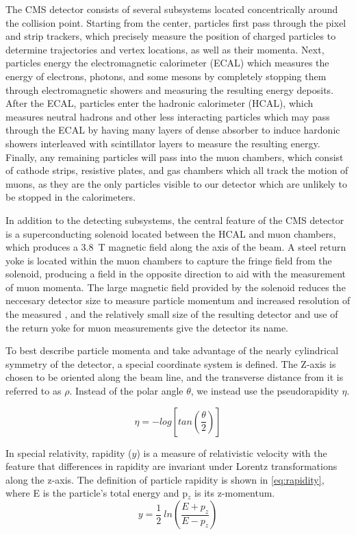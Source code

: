 The CMS detector consists of several subsystems located concentrically around the collision point. 
Starting from the center, particles first pass through the pixel and strip trackers, which precisely measure the position of charged particles to determine trajectories and vertex locations, as well as their momenta.
Next, particles energy the electromagnetic calorimeter (ECAL) which measures the energy of electrons, photons, and some mesons by completely stopping them through electromagnetic showers and measuring the resulting energy deposits.
After the ECAL, particles enter the hadronic calorimeter (HCAL), which measures neutral hadrons and other less interacting particles which may pass through the ECAL by having many layers of dense absorber to induce hardonic showers interleaved with scintillator layers to measure the resulting energy.
Finally, any remaining particles will pass into the muon chambers, which consist of cathode strips, resistive plates, and gas chambers which all track the motion of muons, as they are the only particles visible to our detector which are unlikely to be stopped in the calorimeters.

In addition to the detecting subsystems, the central feature of the CMS detector is a superconducting solenoid located between the HCAL and muon chambers, which produces a \SI{3.8}{\tesla} magnetic field along the axis of the beam. 
A steel return yoke is located within the muon chambers to capture the fringe field from the solenoid, producing a field in the opposite direction to aid with the measurement of muon momenta.
The large magnetic field provided by the solenoid reduces the neccesary detector size to measure particle momentum and increased resolution of the measured \pt, and the relatively small size of the resulting detector and use of the return yoke for muon measurements give the detector its name.

To best describe particle momenta and take advantage of the nearly cylindrical symmetry of the detector, a special coordinate system is defined. 
The Z-axis is chosen to be oriented along the beam line, and the transverse distance from it is referred to as $\rho$. 
Instead of the polar angle $\theta$, we instead use the pseudorapidity $\eta$. 

\begin{equation}
    \label{eq:pseudo}
    \eta = - log \left[tan\left(\frac{\theta}{2}\right)\right]
\end{equation}

In special relativity, rapidity ($y$) is a measure of relativistic velocity with the feature that differences in rapidity are invariant under Lorentz transformations along the z-axis.
The definition of particle rapidity is shown in \cref{eq:rapidity}, where E is the particle's total energy and p$_z$ is its z-momentum.
\begin{equation}
    \label{eq:rapidity}
    y = \frac{1}{2} ~ln \left(\frac{E+p_z}{E-p_z}\right)
\end{equation}

